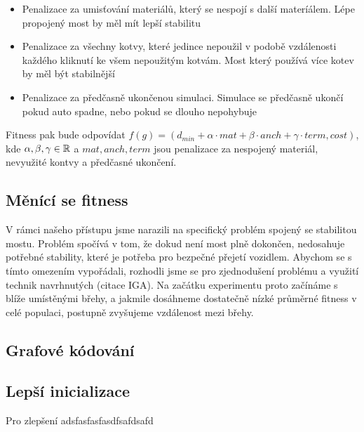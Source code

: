 \begin{itemize}
    \item Penalizace za umisťování materiálů, který se nespojí s další materíálem. Lépe propojený most by měl mít lepší stabilitu
    \item Penalizace za všechny kotvy, které jedince nepoužil v podobě vzdálenosti každého kliknutí ke všem nepoužitým kotvám. Most který používá více kotev by měl být stabilnější
    \item Penalizace za předčasně ukončenou simulaci. Simulace se předčasně ukončí pokud auto spadne, nebo pokud se dlouho nepohybuje
\end{itemize}

Fitness pak bude odpovídat $f(g) = (d_{min} + \alpha \cdot mat + \beta \cdot anch + \gamma \cdot term, cost)$, kde $\alpha, \beta, \gamma \in \mathbb{R}$ a $mat, anch, term$ jsou penalizace za nespojený materiál, nevyužité kontvy a předčasné ukončení.

\subsection{Měnící se fitness}

V rámci našeho přístupu jsme narazili na specifický problém spojený se stabilitou mostu. Problém spočívá v tom, že dokud není most plně dokončen, nedosahuje potřebné stability, které je potřeba pro bezpečné přejetí vozidlem. Abychom se s tímto omezením vypořádali, rozhodli jsme se pro zjednodušení problému a využití technik navrhnutých (citace IGA). Na začátku experimentu proto začínáme s blíže umístěnými břehy, a jakmile dosáhneme dostatečně nízké průměrné fitness v celé populaci, postupně zvyšujeme vzdálenost mezi břehy. 

\subsection{Grafové kódování}


\subsection{Lepší inicializace}

Pro zlepšení adsfasfasfasdfsafdsafd

